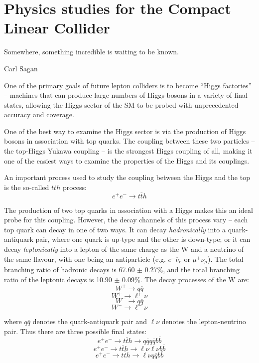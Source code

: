 \chapter{Physics studies for the Compact Linear Collider}
\label{chapter:analysis}

\epigraph{Somewhere, something incredible is waiting to be known.}{Carl Sagan}

One of the primary goals of future lepton colliders is to become ``Higgs factories'' -- machines that can produce large numbers of Higgs bosons in a variety of final states, allowing the Higgs sector of the \acrlong{SM} to be probed with unprecedented accuracy and coverage.

One of the best way to examine the Higgs sector is via the production of Higgs bosons in association with top quarks. The coupling between these two particles -- the top-Higgs Yukawa coupling -- is the strongest Higgs coupling of all, making it one of the easiest ways to examine the properties of the Higgs and its couplings. 

An important process used to study the coupling between the Higgs and the top is the so-called $tth$ process:
$$
e^+ e^- \rightarrow t\overline{t}h
$$

The production of two top quarks in association with a Higgs makes this an ideal probe for this coupling. However, the decay channels of this process vary -- each top quark can decay in one of two ways. It can decay \textit{hadronically} into a quark-antiquark pair, where one quark is up-type and the other is down-type; or it can decay \textit{leptonically} into a lepton of the same charge as the W and a neutrino of the same flavour, with one being an antiparticle (e.g. $e^- \overline{\nu}_e$ or $\mu^+ \nu_\mu$). The total branching ratio of hadronic decays is 67.60 $\pm$ 0.27\%, and the total branching ratio of the leptonic decays is 10.90 $\pm$ 0.09\%. The decay processes of the W are: %
$$
W^+ \rightarrow q\overline{q}
$$
$$
W^+ \rightarrow \ell^+ \nu
$$
$$
W^- \rightarrow q\overline{q}
$$
$$
W^- \rightarrow  \ell^- \nu
$$

where $q\overline{q}$ denotes the quark-antiquark pair and $\ell \nu$ denotes the lepton-neutrino pair. Thus there are three possible final states:
$$
e^+ e^- \rightarrow t\overline{t}h \rightarrow q\overline{q}q\overline{q}b\overline{b}
$$
$$
e^+ e^- \rightarrow t\overline{t}h \rightarrow \ell \nu \ell \nu b \overline{b}
$$
$$
e^+ e^- \rightarrow t\overline{t}h \rightarrow \ell \nu q \overline{q} b \overline{b}
$$


